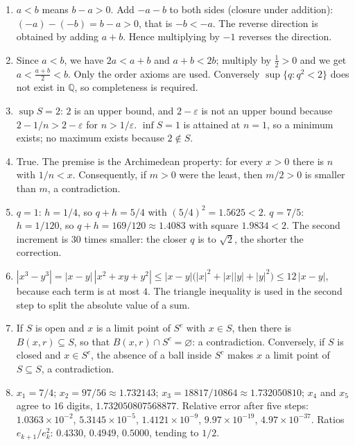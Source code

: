 \begin{enumerate}[label=\textbf{3.\arabic*}]
  \item $a<b$ means $b-a>0$. Add $-a-b$ to both sides (closure under
        addition): $(-a)-(-b)=b-a>0$, that is $-b<-a$. The reverse direction is obtained
        by adding $a+b$. Hence multiplying by $-1$ reverses the direction.

  \item Since $a<b$, we have $2a<a+b$ and $a+b<2b$; multiply by $\tfrac12>0$ and
        we get $a<\frac{a+b}{2}<b$. Only the order axioms are used. Conversely
        $\sup\{q:q^{2}<2\}$ does not exist in $\mathbb{Q}$, so completeness is required.

  \item $\sup S=2$: $2$ is an upper bound, and $2-\varepsilon$ is not an upper bound because
        $2-1/n>2-\varepsilon$ for $n>1/\varepsilon$. $\inf S=1$ is attained at
        $n=1$, so a minimum exists; no maximum exists because $2\notin S$.

  \item True. The premise is the Archimedean property: for every $x>0$ there is $n$ with
        $1/n<x$. Consequently, if $m>0$ were the least, then $m/2>0$ is smaller
        than $m$, a contradiction.

  \item $q=1$: $h=1/4$, so $q+h=5/4$ with $(5/4)^{2}=1. 5625<2$. $q=7/5$:
        $h=1/120$, so $q+h=169/120\approx 1. 4083$ with square
        $1. 9834<2$. The second increment is $30$ times smaller: the closer $q$ is to
        $\sqrt2$, the shorter the correction.

  \item $|x^{3}-y^{3}|=|x-y|\,|x^{2}+xy+y^{2}|\le|x-y|\bigl(|x|^{2}+|x||y|+|y|^{2}\bigr)
        \le 12\,|x-y|$, because each term is at most $4$. The triangle inequality
        is used in the second step to split the absolute value of a sum.

  \item If $S$ is open and $x$ is a limit point of $S^{c}$ with $x\in S$, then there is
        $B(x,r)\subseteq S$, so that $B(x,r)\cap S^{c}=\varnothing$: a contradiction.
        Conversely, if $S$ is closed and $x\in S^{c}$, the absence of a ball inside
        $S^{c}$ makes $x$ a limit point of $S\subseteq S$, a contradiction.

  \item $x_{1}=7/4$; $x_{2}=97/56\approx 1. 732143$;
        $x_{3}=18817/10864\approx 1. 732050810$; $x_{4}$ and $x_{5}$ agree to
        $16$ digits, $1. 732050807568877$. Relative error after
        five steps: $1. 0363\times10^{-2}$, $5. 3145\times10^{-5}$,
        $1. 4121\times10^{-9}$, $9. 97\times10^{-19}$, $4. 97\times10^{-37}$.
        Ratios $e_{k+1}/e_{k}^{2}$: $0. 4330$, $0. 4949$, $0. 5000$, tending to $1/2$.


\end{enumerate}
